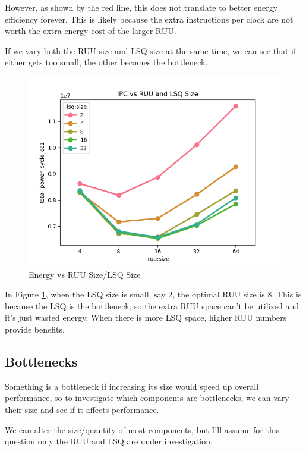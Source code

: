 \documentclass{article}
\begin{document}
\begin{multicols}{2}
  However, as shown by the red line, this does not translate to better energy efficiency forever. This is likely because the extra instructions per clock are not worth the extra energy cost of the larger RUU.

  If we vary both the RUU size and LSQ size at the same time, we can see that if either gets too small, the other becomes the bottleneck.

  \begin{figure}[H]
    \centering
    \includegraphics[width=\linewidth]{./assets/energy_vs_ruu_and_lsq_size.png}
    \caption{Energy vs RUU Size/LSQ Size}
    \label{fig:energy_vs_ruu_lsq}
  \end{figure}

  In Figure \ref{fig:energy_vs_ruu_lsq}, when the LSQ size is small, say 2, the optimal RUU size is 8. This is because the LSQ is the bottleneck, so the extra RUU space can't be utilized and it's just wasted energy. When there is more LSQ space, higher RUU numbers provide benefits.

  \subsection{Bottlenecks}
  Something is a bottleneck if increasing its size would speed up overall performance, so to investigate which components are bottlenecks, we can vary their size and see if it affects performance.

  We can alter the size/quantity of most components, but I'll assume for this question only the RUU and LSQ are under investigation.


\end{multicols}
\end{document}
